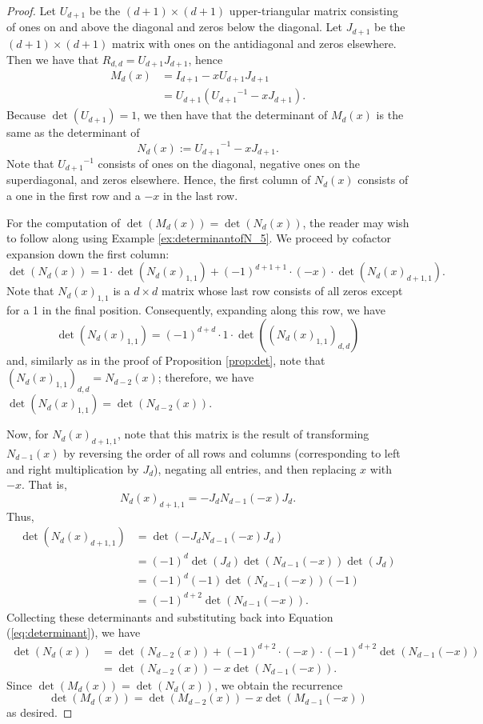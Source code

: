 \documentclass{amsart}
\theoremstyle{definition}
\begin{document}
\begin{proof}
    Let $U_{d+1}$ be the $(d+1)\times(d+1)$ upper-triangular matrix consisting
    of ones on and above the diagonal
    and zeros below the diagonal. Let $J_{d+1}$ be the $(d+1)\times(d+1)$ matrix with ones on the
    antidiagonal and zeros elsewhere. Then we have that $R_{d,d}=U_{d+1}J_{d+1}$,
    hence
    \begin{align*}
        M_d(x)&=I_{d+1}-xU_{d+1}J_{d+1}\\
        &=U_{d+1}\left({U_{d+1}}^{-1}-xJ_{d+1}\right).
    \end{align*}
    Because $\det(U_{d+1})=1$, we then have that the determinant of $M_d(x)$
    is the same as the determinant of
    \[N_d(x):={U_{d+1}}^{-1}-xJ_{d+1}.\] Note that ${U_{d+1}}^{-1}$ consists of ones on the diagonal,
    negative ones on the superdiagonal, and zeros elsewhere. Hence,
    the first column of $N_d(x)$ consists of a one in the first row and
    a $-x$ in the last row.


For the computation of $\det(M_d(x)) = \det(N_d(x))$, the reader may wish to follow along using Example \ref{ex:determinantofN_5}.
    We proceed by cofactor expansion down the first column: 
    \begin{equation}
    \label{eq:determinant}
         \det(N_d(x)) = 1\cdot\det(N_d(x)_{1,1}) + (-1)^{d+1+1}\cdot (-x)\cdot \det(N_d(x)_{d+1,1}).
    \end{equation}
    Note that $N_d(x)_{1,1}$ is a $d\times d$ matrix whose last row consists of all zeros except for a 1 in the final position. Consequently, expanding along this row, we have 
    $$\det(N_d(x)_{1,1}) = (-1)^{d+d}\cdot 1 \cdot \det((N_d(x)_{1,1})_{d,d})$$
    and, similarly as in the proof of Proposition \ref{prop:det}, note that $(N_d(x)_{1,1})_{d,d} = N_{d-2}(x)$; therefore, we have $\det(N_d(x)_{1,1}) = \det(N_{d-2}(x))$.

    Now, for $N_d(x)_{d+1,1}$, note that this matrix is the result of transforming $N_{d-1}(x)$ by reversing the order of all rows and columns (corresponding to left and right multiplication by $J_{d}$), negating all entries, and then replacing $x$ with $-x$.
That is, \[N_d(x)_{d+1,1}=-J_{d}N_{d-1}(-x)J_{d}.\] Thus, \begin{align*}
    \det(N_d(x)_{d+1,1}) &=\det(-J_{d}N_{d-1}(-x)J_{d}) \\
    &=(-1)^{d}\det(J_{d})\det(N_{d-1}(-x))\det(J_{d})\\
    &=(-1)^{d}(-1)\det(N_{d-1}(-x))(-1) \\
    &=(-1)^{d+2}\det(N_{d-1}(-x)).
\end{align*}
Collecting these determinants and substituting back into Equation (\ref{eq:determinant}), we have
\begin{align*}
    \det(N_d(x)) &= \det(N_{d-2}(x)) + (-1)^{d+2}\cdot (-x)\cdot (-1)^{d+2}\det(N_{d-1}(-x))\\
    &=\det(N_{d-2}(x))  -x\det(N_{d-1}(-x)).
\end{align*}
Since $\det(M_d(x)) = \det(N_d(x))$, we obtain the recurrence
$$
\det(M_d(x)) = \det(M_{d-2}(x))  -x\det(M_{d-1}(-x))
$$
as desired.
 


\end{proof}
\end{document}
